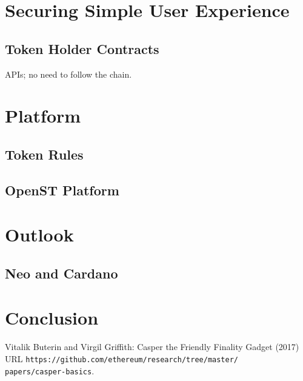 \documentclass[12pt,a4paper,draft]{article}
\begin{document}
\section{Securing Simple User Experience}

\subsection{Token Holder Contracts}

APIs; no need to follow the chain.

\section{Platform}

\subsection{Token Rules}

\subsection{OpenST Platform}

\section{Outlook}

\subsection{Neo and Cardano}

\section{Conclusion}

\begin{thebibliography}{9}

  Vitalik Buterin and Virgil Griffith:
  Casper the Friendly Finality Gadget (2017)\\
  URL \texttt{https://github.com/ethereum/research/tree/master/\\papers/casper-basics}.

\end{thebibliography}
\end{document}
